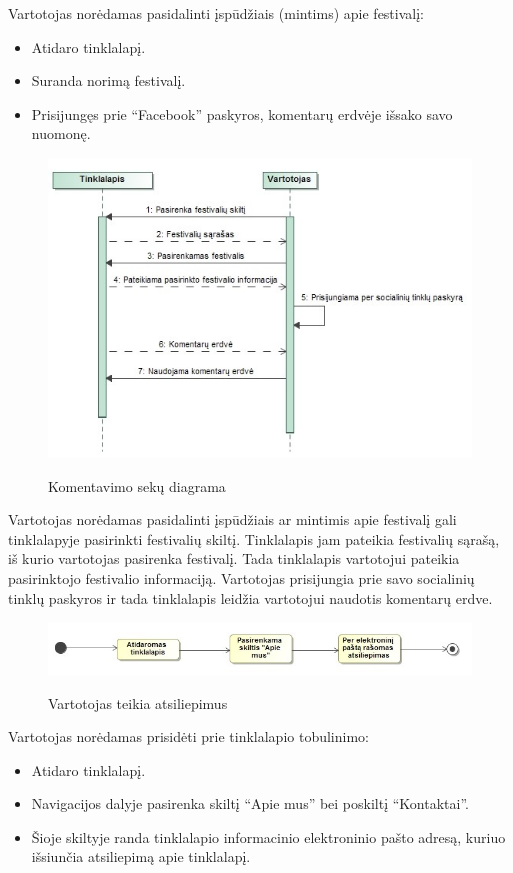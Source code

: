 \documentclass{VUMIFPSkursinis}
\begin{document}
Vartotojas norėdamas pasidalinti įspūdžiais (mintims) apie festivalį:
\begin{itemize}
\item Atidaro tinklalapį.
\item Suranda norimą festivalį.
\item Prisijungęs prie “Facebook” paskyros, komentarų erdvėje išsako savo nuomonę.
\end{itemize}
\begin{figure}[H]
    \centering
    \includegraphics[scale=0.7]{img/geri/_klientasKom}
    \label{img:uml8}
	\caption{Komentavimo sekų diagrama}
\end{figure}

Vartotojas norėdamas pasidalinti įspūdžiais ar mintimis apie festivalį gali tinklalapyje pasirinkti festivalių skiltį. Tinklalapis jam pateikia festivalių sąrašą, iš kurio vartotojas pasirenka festivalį. Tada tinklalapis vartotojui pateikia pasirinktojo festivalio informaciją. Vartotojas prisijungia prie savo socialinių tinklų paskyros ir tada tinklalapis leidžia vartotojui naudotis komentarų erdve.

\begin{figure}[H]
    \centering
    \includegraphics[scale=0.7]{img/geri/klientasKom}
    \label{img:uml9}
	\caption{Vartotojas teikia atsiliepimus}
\end{figure}

Vartotojas norėdamas prisidėti prie tinklalapio tobulinimo:
\begin{itemize}
\item Atidaro tinklalapį.
\item Navigacijos dalyje pasirenka skiltį “Apie mus” bei poskiltį “Kontaktai”.
\item Šioje skiltyje randa tinklalapio informacinio elektroninio pašto adresą, kuriuo išsiunčia atsiliepimą apie tinklalapį.
\end{itemize}
\end{document}
